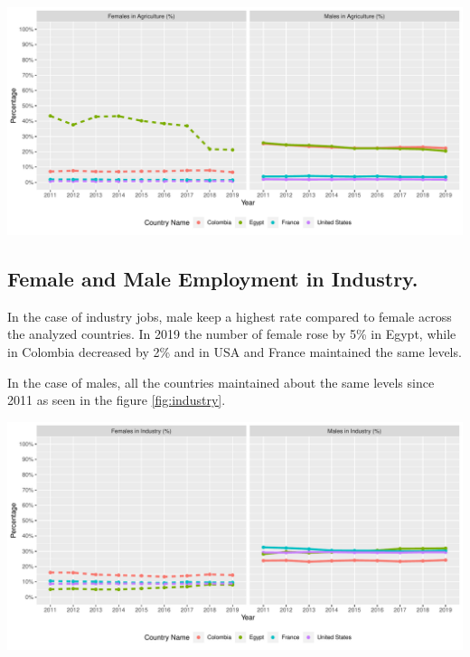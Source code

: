 \documentclass[11pt,a4paper,]{article}
\let\origfigure\figure
\let\endorigfigure\endfigure
\renewenvironment{figure}[1][2] {
    \expandafter\origfigure\expandafter[H]
} {
    \endorigfigure
}
\begin{document}
\begin{figure}
\centering
\includegraphics{The_Outsiders_5513_files/figure-latex/agriculture-1.pdf}
\caption{\label{fig:agriculture}Female and Male Employment in Agriculture}
\end{figure}

\hypertarget{female-and-male-employment-in-industry.}{%
\subsection{Female and Male Employment in Industry.}\label{female-and-male-employment-in-industry.}}

In the case of industry jobs, male keep a highest rate compared to female across the analyzed countries. In 2019 the number of female rose by 5\% in Egypt, while in Colombia decreased by 2\% and in USA and France maintained the same levels.

In the case of males, all the countries maintained about the same levels since 2011 as seen in the figure \ref{fig:industry}.

\begin{figure}
\centering
\includegraphics{The_Outsiders_5513_files/figure-latex/industry-1.pdf}
\caption{\label{fig:industry}Female and Male Employment in Industry}
\end{figure}
\end{document}
